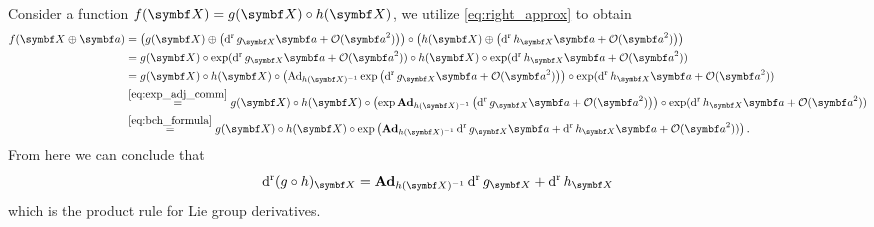 Consider a function $f(\X) = g(\X) \circ h(\X)$, we utilize \eqref{eq:right_approx} to obtain
\begin{equation}
  \begin{aligned}
    f(\X \oplus \a) & = \left( g (\X) \oplus \left(\dr g_\X \a + \mathcal O(\a^2) \right) \right) \circ  \left( h (\X) \oplus \left( \dr h_\X  \a + \mathcal O(\a^2) \right) \right)
    \\
                    & = g(\X) \circ \exp( \dr g_\X \a + \mathcal O(\a^2)) \circ h(\X) \circ \exp( \dr h_\X \a + \mathcal O(\a^2))
    \\
                    & = g(\X) \circ h(\X) \circ \left( \Ad_{h(\X)^{-1}} \exp \left( \dr g_\X \a + \mathcal O(\a^2) \right)  \right) \circ \exp( \dr h_\X \a+ \mathcal O(\a^2) )
    \\
                    & \overset{\eqref{eq:exp_adj_comm}}=  g(\X) \circ h(\X) \circ \left( \exp \bAd_{h(\X)^{-1}} \left( \dr g_\X \a + \mathcal O(\a^2) \right)\right) \circ \exp( \dr h_\X \a + \mathcal O(\a^2))
    \\
                    & \overset{\eqref{eq:bch_formula}}=  g(\X) \circ h(\X) \circ \exp \left( \bAd_{h(\X)^{-1}} \dr g_\X \a + \dr h_\X \a + \mathcal O(\a^2)) \right).
  \end{aligned}
\end{equation}
From here we can conclude that
\begin{equation}
  \label{eq:product_rule}
  \dr (g \circ h)_\X = \bAd_{h(\X)^{-1}} \dr g_\X + \dr h_\X
\end{equation}
which is the product rule for Lie group derivatives.

